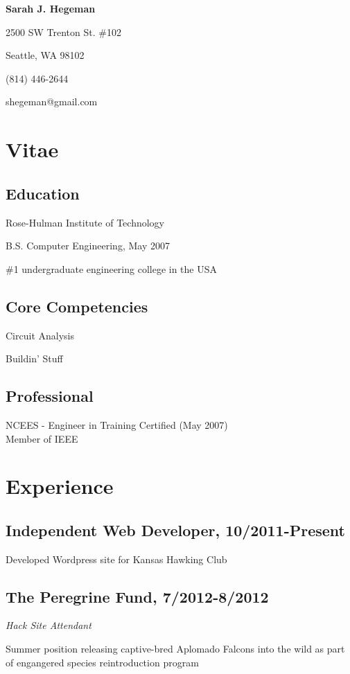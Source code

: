 \documentclass[11pt] {article}
\begin{document}
\begin{center}
\textsf{\textbf{Sarah J. Hegeman}}
\end{center}
\begin{flushright}
2500 SW Trenton St. \#102

Seattle, WA 98102

(814) 446-2644

shegeman@gmail.com
\end{flushright}
\section*{Vitae}
\subsection*{Education}
Rose-Hulman Institute of Technology 

B.S. Computer Engineering, May 2007

\#1 undergraduate engineering college in the USA
\subsection*{Core Competencies}
\begin{multicols}{2}
\begin{itemize*}
\item Circuit Analysis
\item Buildin' Stuff
\end{itemize*}
\end{multicols}
\subsection*{Professional}
NCEES - Engineer in Training Certified (May 2007)\\
Member of IEEE
\section*{Experience}
\subsection*{Independent Web Developer, 10/2011-Present}
\begin{itemize*}
\item Developed Wordpress site for Kansas Hawking Club
\end{itemize*}

\subsection*{The Peregrine Fund, 7/2012-8/2012}
\textit{Hack Site Attendant}
\begin{itemize*}
\item Summer position releasing captive-bred Aplomado Falcons into the wild as part of engangered species reintroduction program
\end{itemize*}
\end{document}
